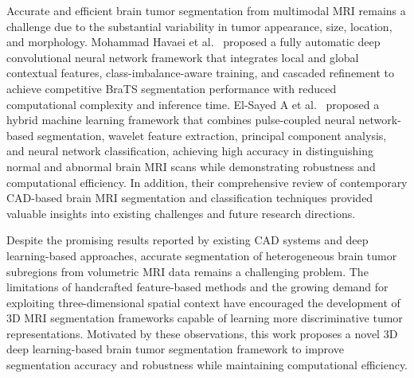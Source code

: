 Accurate and efficient brain tumor segmentation from multimodal MRI remains a challenge due to the substantial variability in tumor appearance, size, location, and morphology. Mohammad Havaei et al.~\cite{havaei2017brain} proposed a fully automatic deep convolutional neural network framework that integrates local and global contextual features, class-imbalance-aware training, and cascaded refinement to achieve competitive BraTS segmentation performance with reduced computational complexity and inference time. El-Sayed A et al.~\cite{el2014computer} proposed a hybrid machine learning framework that combines pulse-coupled neural network-based segmentation, wavelet feature extraction, principal component analysis, and neural network classification, achieving high accuracy in distinguishing normal and abnormal brain MRI scans while demonstrating robustness and computational efficiency. In addition, their comprehensive review of contemporary CAD-based brain MRI segmentation and classification techniques \cite{maitra2008hybrid, el2010hybrid, cheng2010automated, cherkassky2007learning} provided valuable insights into existing challenges and future research directions.

Despite the promising results reported by existing CAD systems and deep learning-based approaches, accurate segmentation of heterogeneous brain tumor subregions from volumetric MRI data remains a challenging problem. The limitations of handcrafted feature-based methods and the growing demand for exploiting three-dimensional spatial context have encouraged the development of 3D MRI segmentation frameworks capable of learning more discriminative tumor representations. Motivated by these observations, this work proposes a novel 3D deep learning-based brain tumor segmentation framework to improve segmentation accuracy and robustness while maintaining computational efficiency.

\vspace*{-1\baselineskip}
